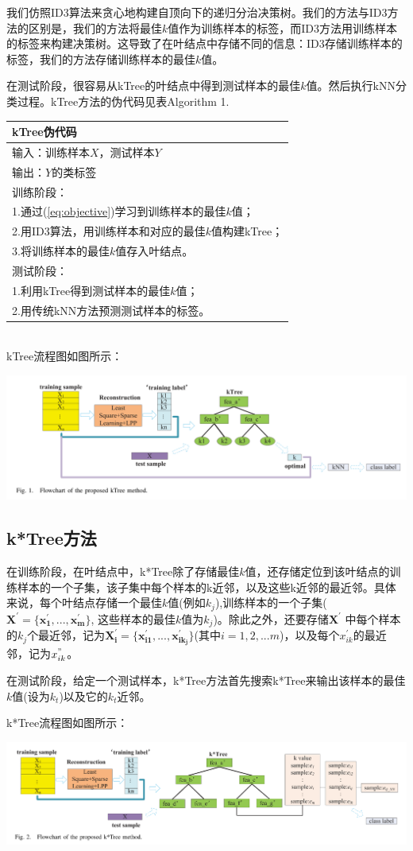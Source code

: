 \documentclass{ctexart}
\begin{document}
	我们仿照ID3算法来贪心地构建自顶向下的递归分治决策树。我们的方法与ID3方法的区别是，我们的方法将最佳$ k $值作为训练样本的标签，而ID3方法用训练样本的标签来构建决策树。这导致了在叶结点中存储不同的信息：ID3存储训练样本的标签，我们的方法存储训练样本的最佳$ k $值。
	
	在测试阶段，很容易从kTree的叶结点中得到测试样本的最佳$ k $值。然后执行kNN分类过程。kTree方法的伪代码见表Algorithm 1.
	\\
	
	\begin{tabular}{p{8cm}}
		\hline
		\boldmath{Algorithm1} kTree伪代码 \\
		\hline
		输入：训练样本$ X $，测试样本$ Y $ \\
		输出：$ Y $的类标签 \\
		训练阶段： \\
		1.通过(\ref{eq:objective})学习到训练样本的最佳$ k $值； \\
		2.用ID3算法，用训练样本和对应的最佳$ k $值构建kTree； \\
		3.将训练样本的最佳$ k $值存入叶结点。 \\
		测试阶段：\\
		1.利用kTree得到测试样本的最佳$ k $值； \\
		2.用传统kNN方法预测测试样本的标签。\\
		\hline
	\end{tabular}
	\\
	
	kTree流程图如图所示：
	
	\includegraphics[scale=0.4]{kTree}

	\subsection{k*Tree方法}
	在训练阶段，在叶结点中，k*Tree除了存储最佳$ k $值，还存储定位到该叶结点的训练样本的一个子集，该子集中每个样本的k近邻，以及这些k近邻的最近邻。具体来说，每个叶结点存储一个最佳$ k $值(例如$ k_j $),训练样本的一个子集($ \mathbf{X^{'} = \lbrace {x_1^{'},...,x_m^{'}} \rbrace} $, 这些样本的最佳$ k $值为$ k_j $)。除此之外，还要存储$ \mathbf X^{'} $ 中每个样本的$ k_j $个最近邻，记为$ \mathbf{X_i^{'} = \lbrace {x_{i1}^{'},...,x_{ik_j}^{'}} \rbrace} $(其中$ i=1,2,...m $)，以及每个$ x_{ik}^{'} $的最近邻，记为$ x_{ik}^{"} $。
	
	在测试阶段，给定一个测试样本，k*Tree方法首先搜索k*Tree来输出该样本的最佳$ k $值(设为$ k_t $)以及它的$ k_t $近邻。
	
	k*Tree流程图如图所示：
	
	\includegraphics[scale=0.4]{kStarTree}
\end{document}
